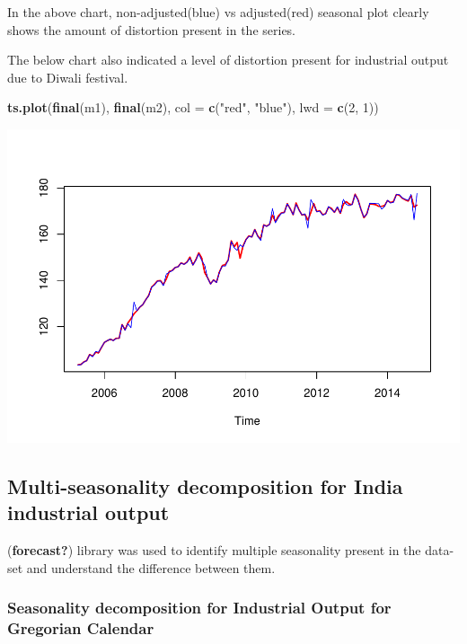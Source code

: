 \documentclass[
]{article}
\newenvironment{Shaded}{\begin{snugshade}}{\end{snugshade}}
\newcommand{\AttributeTok}[1]{\textcolor[rgb]{0.13,0.29,0.53}{#1}}
\newcommand{\DecValTok}[1]{\textcolor[rgb]{0.00,0.00,0.81}{#1}}
\newcommand{\FunctionTok}[1]{\textcolor[rgb]{0.13,0.29,0.53}{\textbf{#1}}}
\newcommand{\NormalTok}[1]{#1}
\newcommand{\StringTok}[1]{\textcolor[rgb]{0.31,0.60,0.02}{#1}}
\begin{document}
In the above chart, non-adjusted(blue) vs adjusted(red) seasonal plot
clearly shows the amount of distortion present in the series.

The below chart also indicated a level of distortion present for
industrial output due to Diwali festival.

\begin{Shaded}
\begin{Highlighting}[]
\FunctionTok{ts.plot}\NormalTok{(}\FunctionTok{final}\NormalTok{(m1), }\FunctionTok{final}\NormalTok{(m2), }\AttributeTok{col =} \FunctionTok{c}\NormalTok{(}\StringTok{"red"}\NormalTok{, }\StringTok{"blue"}\NormalTok{), }\AttributeTok{lwd =} \FunctionTok{c}\NormalTok{(}\DecValTok{2}\NormalTok{, }\DecValTok{1}\NormalTok{))}
\end{Highlighting}
\end{Shaded}

\includegraphics{regressors_of_diwali_seasonality_for_industrial_production_files/figure-latex/unnamed-chunk-13-1.pdf}

\hypertarget{multi-seasonality-decomposition-for-india-industrial-output}{%
\subsection{Multi-seasonality decomposition for India industrial
output}\label{multi-seasonality-decomposition-for-india-industrial-output}}

(\textbf{forecast?}) library was used to identify multiple seasonality
present in the data-set and understand the difference between them.

\hypertarget{seasonality-decomposition-for-industrial-output-for-gregorian-calendar}{%
\subsubsection{Seasonality decomposition for Industrial Output for
Gregorian
Calendar}\label{seasonality-decomposition-for-industrial-output-for-gregorian-calendar}}
\end{document}
